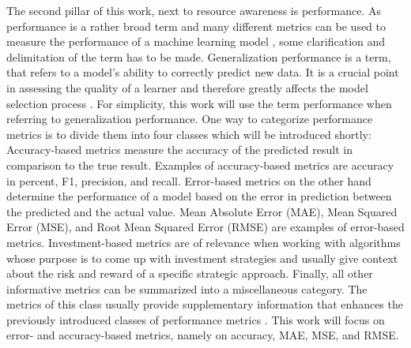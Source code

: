 The second pillar of this work, next to resource awareness is performance. As performance is a rather broad term and many different metrics can be used to measure the performance of a machine learning model \cite{erickson2021}, some clarification and delimitation of the term has to be made. Generalization performance is a term, that refers to a model’s ability to correctly predict new data. It is a crucial point in assessing the quality of a learner and therefore greatly affects the model selection process \cite{hastie2009}. For simplicity, this work will use the term performance when referring to generalization performance. One way to categorize performance metrics is to divide them into four classes which will be introduced shortly: Accuracy-based metrics measure the accuracy of the predicted result in comparison to the true result. Examples of accuracy-based metrics are accuracy in percent, F1, precision, and recall. Error-based metrics on the other hand determine the performance of a model based on the error in prediction between the predicted and the actual value. Mean Absolute Error (MAE), Mean Squared Error (MSE), and Root Mean Squared Error (RMSE) are examples of error-based metrics. Investment-based metrics are of relevance when working with algorithms whose purpose is to come up with investment strategies and usually give context about the risk and reward of a specific strategic approach. Finally, all other informative metrics can be summarized into a miscellaneous category. The metrics of this class usually provide supplementary information that enhances the previously introduced classes of performance metrics \cite{dessain2022}. This work will focus on error- and accuracy-based metrics, namely on accuracy, MAE, MSE, and RMSE.

